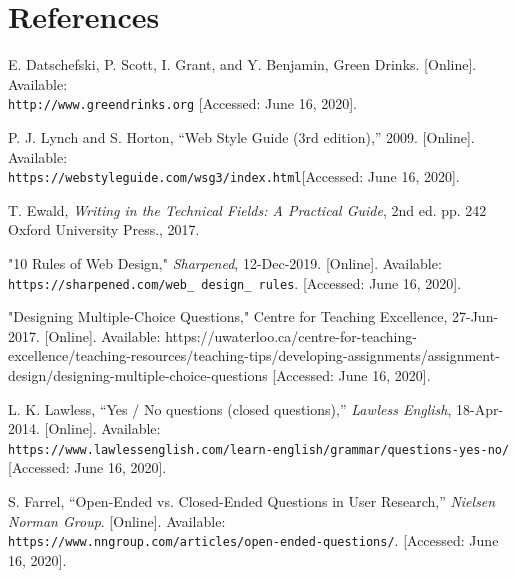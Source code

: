 \documentclass[12pt]{article}
\begin{document}
\begin{center}

    

\end{center}


\pagebreak

\section{References}

\begin{thebibliography}{9}

E. Datschefski, P. Scott, I. Grant, and Y. Benjamin, Green Drinks. [Online]. Available:	\\\texttt{http://www.greendrinks.org} [Accessed: June 16, 2020].

P. J. Lynch and S. Horton, “Web Style Guide (3rd edition),” 2009. [Online]. Available: \\\texttt {https://webstyleguide.com/wsg3/index.html}[Accessed: June 16, 2020].

T. Ewald,\textit{ Writing in the Technical Fields: A Practical Guide}, 2nd ed. pp. 242 Oxford University Press., 2017. 


 "10 Rules of Web Design," \textit{Sharpened}, 12-Dec-2019. [Online]. Available: \\\texttt{https://sharpened.com/web\_ design\_ rules}. [Accessed: June 16, 2020]. 
 
 
"Designing Multiple-Choice Questions," Centre for Teaching Excellence, 27-Jun-2017. [Online]. Available: https://uwaterloo.ca/centre-for-teaching-excellence/teaching-resources/teaching-tips/developing-assignments/assignment-design/designing-multiple-choice-questions [Accessed: June 16, 2020].


 L. K. Lawless, “Yes / No questions (closed questions),” \textit{Lawless English}, 18-Apr-2014. [Online]. Available: \\\texttt{https://www.lawlessenglish.com/learn-english/grammar/questions-yes-no/} [Accessed: June 16, 2020].
 
 S. Farrel, “Open-Ended vs. Closed-Ended Questions in User Research,” \textit{Nielsen Norman Group}. [Online]. Available: \\\texttt{https://www.nngroup.com/articles/open-ended-questions/}. [Accessed: June 16, 2020].
 

\end{thebibliography}
\end{document}
